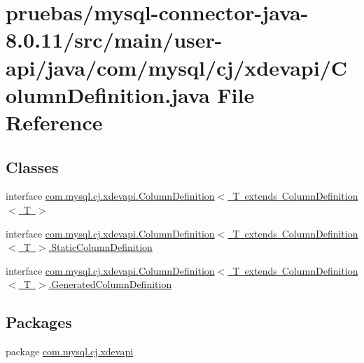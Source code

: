\hypertarget{user-api_2java_2com_2mysql_2cj_2xdevapi_2_column_definition_8java}{}\section{pruebas/mysql-\/connector-\/java-\/8.0.11/src/main/user-\/api/java/com/mysql/cj/xdevapi/\+Column\+Definition.java File Reference}
\label{user-api_2java_2com_2mysql_2cj_2xdevapi_2_column_definition_8java}
\subsection*{Classes}
\begin{DoxyCompactItemize}
\item 
interface \mbox{\hyperlink{interfacecom_1_1mysql_1_1cj_1_1xdevapi_1_1_column_definition}{com.\+mysql.\+cj.\+xdevapi.\+Column\+Definition$<$ T extends Column\+Definition$<$ T $>$}}
\item 
interface \mbox{\hyperlink{interfacecom_1_1mysql_1_1cj_1_1xdevapi_1_1_column_definition_1_1_static_column_definition}{com.\+mysql.\+cj.\+xdevapi.\+Column\+Definition$<$ T extends Column\+Definition$<$ T $>$.\+Static\+Column\+Definition}}
\item 
interface \mbox{\hyperlink{interfacecom_1_1mysql_1_1cj_1_1xdevapi_1_1_column_definition_1_1_generated_column_definition}{com.\+mysql.\+cj.\+xdevapi.\+Column\+Definition$<$ T extends Column\+Definition$<$ T $>$.\+Generated\+Column\+Definition}}
\end{DoxyCompactItemize}
\subsection*{Packages}
\begin{DoxyCompactItemize}
\item 
package \mbox{\hyperlink{namespacecom_1_1mysql_1_1cj_1_1xdevapi}{com.\+mysql.\+cj.\+xdevapi}}
\end{DoxyCompactItemize}
